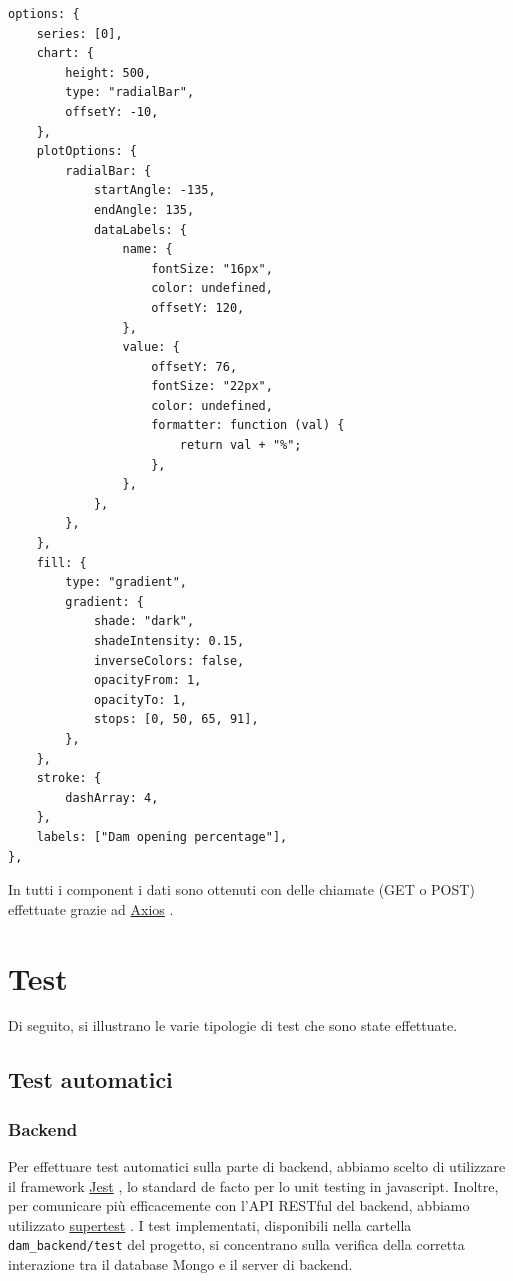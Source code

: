 \documentclass[a4paper,12pt]{report}
\newcommand{\axios}{\href{https://axios-http.com/}{Axios} }
\newcommand{\jest}{\href{https://jestjs.io/}{Jest} }
\newcommand{\supertest}{\href{https://www.npmjs.com/package/supertest}{supertest} }
\begin{document}
\begin{itemize}
    \begin{verbatim}
options: {
    series: [0],
    chart: {
        height: 500,
        type: "radialBar",
        offsetY: -10,
    },
    plotOptions: {
        radialBar: {
            startAngle: -135,
            endAngle: 135,
            dataLabels: {
                name: {
                    fontSize: "16px",
                    color: undefined,
                    offsetY: 120,
                },
                value: {
                    offsetY: 76,
                    fontSize: "22px",
                    color: undefined,
                    formatter: function (val) {
                        return val + "%";
                    },
                },
            },
        },
    },
    fill: {
        type: "gradient",
        gradient: {
            shade: "dark",
            shadeIntensity: 0.15,
            inverseColors: false,
            opacityFrom: 1,
            opacityTo: 1,
            stops: [0, 50, 65, 91],
        },
    },
    stroke: {
        dashArray: 4,
    },
    labels: ["Dam opening percentage"],
},
    \end{verbatim}
    
\end{itemize}
In tutti i component i dati sono ottenuti con delle chiamate (GET o POST) effettuate grazie ad \axios.

\clearpage
\chapter{Test}\label{sec:testing}
Di seguito, si illustrano le varie tipologie di test che sono state effettuate.

\section{Test automatici}
\subsection{Backend}
Per effettuare test automatici sulla parte di backend, abbiamo scelto di utilizzare il framework \jest, lo standard de facto per lo unit testing in javascript. Inoltre, per comunicare più efficacemente con l'API RESTful del backend, abbiamo utilizzato \supertest. I test implementati, disponibili nella cartella \texttt{dam\_backend/test} del progetto, si concentrano sulla verifica della corretta interazione tra il database Mongo e il server di backend.
\end{document}
